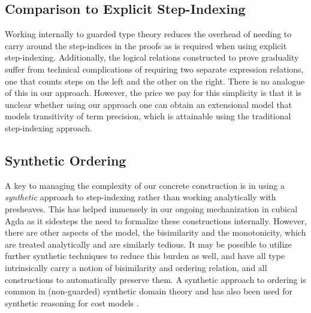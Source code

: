 \begin{comment}
Besides the abstract model and its concrete construction on dynamic type, 
we will also formalize the adequacy result in \ref{sec:appendix-adequacy}, 
which involves clock quantification of the lift monad, the weak bisim 
relation, and the lock-step error ordering. In order to prove adequacy, 
we will first prove that the global lift of X is isomorphic to Delay(1 + X)
whether X is clock-irrelevant or not. Then, we aim to prove the equivalence 
between the global lock-step error ordering and the error ordering observed 
in Delay(1 + X) and equivalence between the global weak bisimilarity 
relation and the weak bisimilarity relation on Delay(1 + X). We have 
finished some prerequisite proofs on clock quantification and postulated 
some theorems on clock globalization.
\end{comment}

\subsection{Comparison to Explicit Step-Indexing}
Working internally to guarded type theory reduces the overhead of needing to
carry around the step-indices in the proofs as is required when using explicit
step-indexing. Additionally, the logical relations constructed to prove
graduality suffer from technical complications of requiring two separate
expression relations, one that counts steps on the left and the other on the right.
There is no analogue of this in our approach.
However, the price we pay for this simplicity is that it is unclear
whether using our approach one can obtain an extensional model that models transitivity
of term precision, which is attainable using the traditional step-indexing approach.


\subsection{Synthetic Ordering}
A key to managing the complexity of our concrete construction is in
using a \emph{synthetic} approach to step-indexing rather than working
analytically with presheaves. This has helped immensely in our ongoing
mechanization in cubical Agda as it sidesteps the need to formalize
these constructions internally. 
%
However, there are other aspects of the model, the bisimilarity and
the monotonicity, which are treated analytically and are similarly
tedious.
%
It may be possible to utilize further synthetic techniques to reduce
this burden as well, and have all type intrinsically carry a notion of
bisimilarity and ordering relation, and all constructions to
automatically preserve them.
%
A synthetic approach to ordering is common in (non-guarded) synthetic
domain theory and has also been used for synthetic reasoning for cost
models \cite{synthetic-domain-theory,decalf}.

